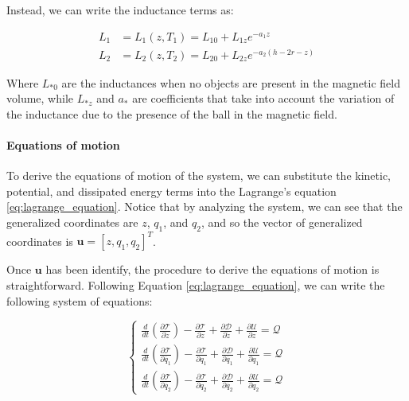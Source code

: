 Instead, we can write the inductance terms as:

\begin{equation}
    \begin{aligned}
        L_1 & = L_1(z, T_1) = L_{10} + L_{1z} e^{-a_1 z}            \\
        L_2 & = L_2(z, T_2) = L_{20} + L_{2z} e^{-a_2 (h - 2r - z)}
    \end{aligned}
    \label{eq:inductance}
\end{equation}

Where $L_{*0}$ are the inductances when no objects are present in the magnetic field volume, while $L_{*z}$ and $a_*$ are coefficients that take into account the variation of the inductance due to the presence of the ball in the magnetic field.

\paragraph{Equations of motion}

To derive the equations of motion of the system, we can substitute the kinetic, potential, and dissipated energy terms into the Lagrange's equation \ref{eq:lagrange_equation}.
Notice that by analyzing the system, we can see that the generalized coordinates are $z$, $q_1$, and $q_2$, and so the vector of generalized coordinates is $\mathbf{u} = [z, q_1, q_2]^T$.

Once $\mathbf{u}$ has been identify, the procedure to derive the equations of motion is straightforward.
Following Equation \ref{eq:lagrange_equation}, we can write the following system of equations:

\begin{equation}
    \begin{cases}
        \frac{d}{dt} \left( \frac{\partial \mathcal{T}}{\partial \dot{z}} \right) - \frac{\partial \mathcal{T}}{\partial z} + \frac{\partial \mathcal{D}}{\partial \dot{z}} + \frac{\partial \mathcal{U}}{\partial z} = \mathcal{Q}         \\
        \frac{d}{dt} \left( \frac{\partial \mathcal{T}}{\partial \dot{q_1}} \right) - \frac{\partial \mathcal{T}}{\partial q_1} + \frac{\partial \mathcal{D}}{\partial \dot{q_1}} + \frac{\partial \mathcal{U}}{\partial q_1} = \mathcal{Q} \\
        \frac{d}{dt} \left( \frac{\partial \mathcal{T}}{\partial \dot{q_2}} \right) - \frac{\partial \mathcal{T}}{\partial q_2} + \frac{\partial \mathcal{D}}{\partial \dot{q_2}} + \frac{\partial \mathcal{U}}{\partial q_2} = \mathcal{Q}
    \end{cases}
\end{equation}

